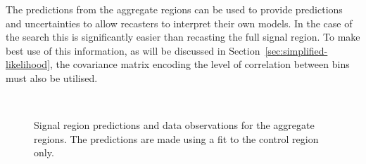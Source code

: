 The predictions from the aggregate regions
can be used to provide predictions and uncertainties
to allow recasters to interpret their own models. In the case of the \alphat search
this is significantly easier than recasting the full signal region. To make best use of this information, 
as will be discussed in Section~\ref{sec:simplified-likelihood}, 
the covariance matrix encoding the level of correlation between bins must also be utilised.
\clearpage
\begin{figure}[!tbhp]
    \caption{ Signal region predictions and data observations for the aggregate regions. 
    The predictions are made using a fit to the control region only. \label{fig:aggFitResult} }
  \begin{center}
     ~~
     \\

\end{center}
\end{figure}
